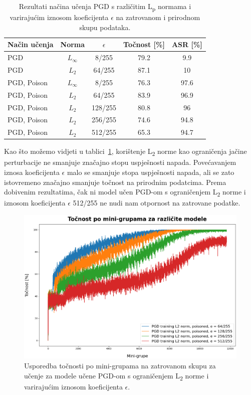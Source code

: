 \documentclass[times, utf8, zavrsni, numeric]{fer}
\begin{document}
\begin{table}[htb]
    \caption{Rezultati načina učenja PGD s različitim L\textsubscript{p} normama i varirajućim iznosom koeficijenta $\epsilon$ na zatrovanom i prirodnom skupu podataka.}
    \label{tbl:mjerenja_zatrovano_norme}
    \centering
    \begin{tabular}{lcccc} \hline
    Način učenja & Norma & $\epsilon$ & Točnost [\%] & ASR [\%]\\ \hline
    PGD & $L_\infty$ & 8/255 & 79.2 & 9.9 \\
    PGD & $L_2$ & 64/255 & 87.1 & 10 \\
    PGD, Poison & $L_\infty$ & 8/255 & 76.3 & 97.6 \\
    PGD, Poison & $L_2$ & 64/255 & 83.9 & 96.9 \\
    PGD, Poison & $L_2$ & 128/255 & 80.8 & 96 \\
    PGD, Poison & $L_2$ & 256/255 & 74.6 & 94.8 \\
    PGD, Poison & $L_2$ & 512/255 & 65.3 & 94.7 \\ \hline
    \end{tabular}
\end{table}

Kao što možemo vidjeti u tablici~\ref{tbl:mjerenja_zatrovano_norme}, korištenje L\textsubscript{2} norme kao ograničenja jačine perturbacije ne smanjuje značajno stopu uspješnosti napada.
Povećavanjem iznosa koeficijenta $\epsilon$ malo se smanjuje stopa uspješnosti napada, ali se zato istovremeno značajno smanjuje točnost na prirodnim podatcima.
Prema dobivenim rezultatima, čak ni model učen PGD-om s ograničenjem L\textsubscript{2} norme i iznosom koeficijenta $\epsilon$ 512/255 ne nudi nam otpornost na zatrovane podatke.

\pagebreak

\begin{figure}[htb]
    \centering
    \includegraphics[scale=0.4]{../stats/train_accuracy_comparison_pgd_l2_only.png}
    \caption{Usporedba točnosti po mini-grupama na zatrovanom skupu za učenje za modele učene PGD-om s ograničenjem L\textsubscript{2} norme i varirajućim iznosom koeficijenta $\epsilon$.}
    \label{fig:pgd_l2_comparison}
\end{figure}
\end{document}
